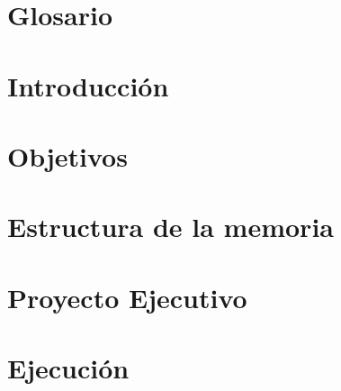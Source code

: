 \documentclass[12pt,a4paper]{article}
\begin{document}
%
%



	\section{Glosario}\label{sec:glossary}
		
	\section{Introducción}\label{sec:introduccion}
		
	\section{Objetivos}\label{sec:objetivos}
		
	\section{Estructura de la memoria}\label{sec:estructura}
		
	\section{Proyecto Ejecutivo}\label{sec:proyecto_ejecutivo}
		
	\section{Ejecución}\label{sec:ejecucion}
		
%		
%		
%		
\newpage
\end{document}
